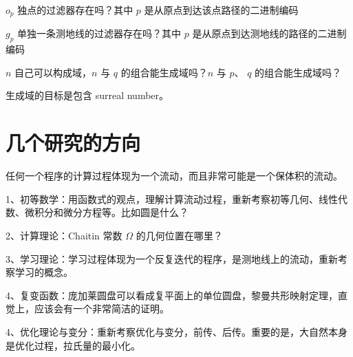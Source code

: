 \documentclass[a4paper,12pt]{article}
\begin{document}
$o_p$ 独点的过滤器存在吗？其中 $p$ 是从原点到达该点路径的二进制编码

$g_p$ 单独一条测地线的过滤器存在吗？其中 $p$ 是从原点到达测地线的路径的二进制编码

$n$ 自己可以构成域，$n$ 与 $q$ 的组合能生成域吗？$n$ 与 $p$、 $q$ 的组合能生成域吗？

生成域的目标是包含 surreal number。

\newpage

\section{几个研究的方向}

任何一个程序的计算过程体现为一个流动，而且非常可能是一个保体积的流动。

1、初等数学：用函数式的观点，理解计算流动过程，重新考察初等几何、线性代数、微积分和微分方程等。比如圆是什么？

2、计算理论：Chaitin 常数 $\Omega$ 的几何位置在哪里？

3、学习理论：学习过程体现为一个反复迭代的程序，是测地线上的流动，重新考察学习的概念。

4、复变函数：庞加莱圆盘可以看成复平面上的单位圆盘，黎曼共形映射定理，直觉上，应该会有一个非常简洁的证明。

4、优化理论与变分：重新考察优化与变分，前传、后传。重要的是，大自然本身是优化过程，拉氏量的最小化。
\end{document}
